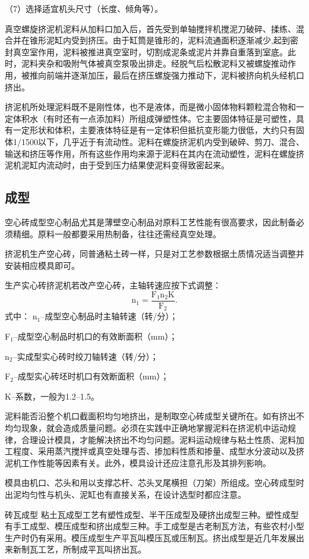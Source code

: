 \documentclass{ctexbook}
\begin{document}
（7）选择适宜机头尺寸（长度、倾角等）。

真空螺旋挤泥机泥料从加料口加入后，首先受到单轴搅拌机搅泥刀破碎、揉练、混合并在锥形泥缸内受到挤压。由于缸筒是锥形的，泥料流通面积逐渐减少,起到密封真空室作用，泥料被推进真空室时，切割成泥条或泥片并靠自重落到室底。此时，泥料夹杂和吸附气体被真空泵吸出排走。经脱气后松散泥料又被螺旋推动作用，被推向前端并逐渐加压，最后在挤压螺旋强力推动下，泥料被挤向机头经机口挤出。

挤泥机所处理泥料既不是刚性体，也不是液体，而是微小固体物料颗粒混合物和一定体积水（有时还有一点添加料）所组成弹塑性体。它主要固体特征是可塑性，具有一定形状和体积，主要液体特征是有一定体积但抵抗变形能力很低，大约只有固体1/1500以下，几乎近于有流动性。泥料在螺旋挤泥机内受到破碎、剪刀、混合、输送和挤压等作用，所有这些作用均来源于泥料在其内在流动塑性，泥料在螺旋挤泥机泥缸内流动时，由于受到压力结果使泥料变得致密起来。
\subsection{成型}
空心砖成型空心制品尤其是薄壁空心制品对原料工艺性能有很高要求，因此制备必须精细。原料一般都要采用热制备，往往还需经真空处理。

挤泥机生产空心砖，同普通粘土砖一样，只是对工艺参数根据土质情况适当调整并安装相应模具即可。

生产实心砖挤泥机若改产空心砖，主轴转速应按下式调整：
\begin{equation*}
	\text{n$_1$}=\frac{\text{F$_{1}$}\text{n$_2$}\text{K}}{\text{F$_2$}}.
\end{equation*}
式中：
n$_1$--成型空心制品时主轴转速（转/分）；

F$_1$--成型空心制品时机口的有效断面积（mm）；

n$_2$--实成型实心砖时绞刀轴转速（转/分）；

F$_2$--成型实心砖坯时机口有效断面积（mm）；

K--系数，一般为1.2--1.5。

泥料能否沿整个机口截面积均匀地挤出，是制取空心砖成型关键所在。如有挤出不均匀现象，就会造成质量问题。必须在实践中正确地掌握泥料在挤泥机中运动规律，合理设计模具，才能解决挤出不均匀问题。泥料运动规律与粘土性质、泥料加工程度、采用蒸汽搅拌或真空处理与否、掺加料性质和掺量、成型水分波动以及挤泥机工作性能等因素有关。此外，模具设计还应注意孔形及其排列影响。

模具由机口、芯头和用以支撑芯杆、芯头叉尾横担（刀架）所组成。空心砖成型时出泥均匀性与机头、泥缸也有直接关系，在设计选型时都应注意。

砖瓦成型 粘土瓦成型工艺有塑性成型、半干压成型及硬挤出成型三种。塑性成型有手工成型、模压成型和挤出成型三种。手工成型是古老制瓦方法，有些农村小型生产时仍有采用。模压成型生产平瓦叫模压瓦或压制瓦。挤出成型是近几年发展出来新制瓦工艺，所制成平瓦叫挤出瓦。
\end{document}
